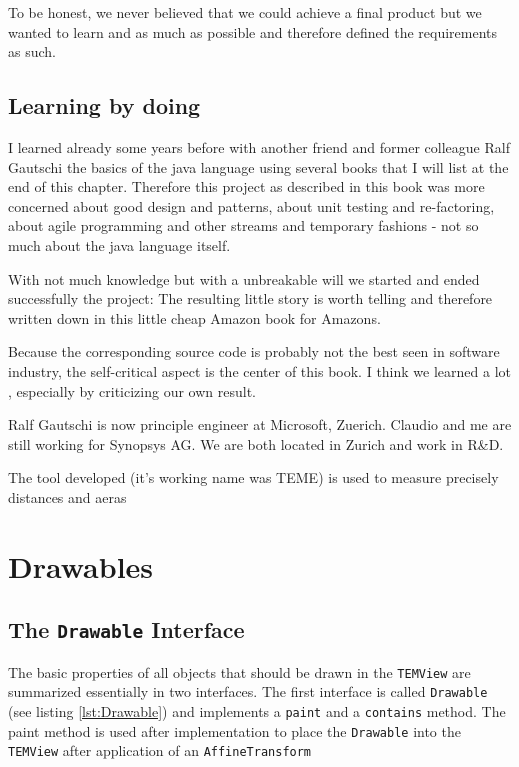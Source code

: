 \documentclass[a4paper]{book}
\begin{document}
To be honest, we never believed that we could achieve a final product but we wanted to learn and as much as possible and therefore defined the requirements as such. 

\section{Learning by doing}

I learned already some years before with another friend and former colleague Ralf Gautschi the basics of the java language using several books that I will list at the end of this chapter. Therefore this project as described in this book was more concerned about good design and patterns, about unit testing and re-factoring, about agile programming and other streams and temporary fashions - not so much about the java language itself. 

With not much knowledge but with a unbreakable will we started and ended successfully the project: 
The resulting little story is worth telling and therefore written down in this little cheap Amazon book for Amazons.

Because the corresponding source code is probably not the best seen in software 
industry,  the self-critical aspect is the center of this book. I think we learned a lot
, especially by criticizing our own result.

Ralf Gautschi is now principle engineer at Microsoft, Zuerich. Claudio and me are still working for Synopsys AG. We are both located in Zurich and work in R\&D. 
   
   
The tool developed (it's working name was TEME) is used to measure precisely distances and aeras   
   
\chapter{Drawables}

\section{The \texttt{Drawable} Interface}

The basic properties of all objects that should be drawn in the \texttt{TEMView} are summarized essentially in two
interfaces. The first interface is called \texttt{Drawable} (see listing \ref{lst:Drawable}) and implements a
\texttt{paint} and a \texttt{contains} method.
The paint method is used after implementation to place the \texttt{Drawable} into the \texttt{TEMView}
after application of an \texttt{AffineTransform}
\end{document}
